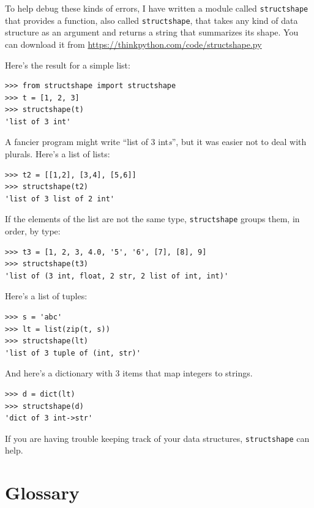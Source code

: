 \documentclass[10pt]{book}
\begin{document}
To help debug these kinds of errors, I have written a module
called {\tt structshape} that provides a function, also called
{\tt structshape}, that takes any kind of data structure as
an argument and returns a string that summarizes its shape.
You can download it from \url{https://thinkpython.com/code/structshape.py}

Here's the result for a simple list:

\begin{verbatim}
>>> from structshape import structshape
>>> t = [1, 2, 3]
>>> structshape(t)
'list of 3 int'
\end{verbatim}
%
A fancier program might write ``list of 3 int{\em s}'', but it
was easier not to deal with plurals.  Here's a list of lists:

\begin{verbatim}
>>> t2 = [[1,2], [3,4], [5,6]]
>>> structshape(t2)
'list of 3 list of 2 int'
\end{verbatim}
%
If the elements of the list are not the same type,
{\tt structshape} groups them, in order, by type:

\begin{verbatim}
>>> t3 = [1, 2, 3, 4.0, '5', '6', [7], [8], 9]
>>> structshape(t3)
'list of (3 int, float, 2 str, 2 list of int, int)'
\end{verbatim}
%
Here's a list of tuples:

\begin{verbatim}
>>> s = 'abc'
>>> lt = list(zip(t, s))
>>> structshape(lt)
'list of 3 tuple of (int, str)'
\end{verbatim}
%
And here's a dictionary with 3 items that map integers to strings.

\begin{verbatim}
>>> d = dict(lt)
>>> structshape(d)
'dict of 3 int->str'
\end{verbatim}
%
If you are having trouble keeping track of your data structures,
{\tt structshape} can help.


\section{Glossary}
\end{document}
